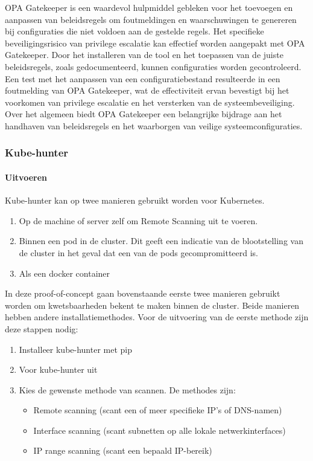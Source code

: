 OPA Gatekeeper is een waardevol hulpmiddel gebleken voor het toevoegen en aanpassen van beleidsregels om foutmeldingen en waarschuwingen te genereren bij configuraties die niet voldoen aan de gestelde regels. Het specifieke beveiligingsrisico van privilege escalatie kan effectief worden aangepakt met OPA Gatekeeper. Door het installeren van de tool en het toepassen van de juiste beleidsregels, zoals gedocumenteerd, kunnen configuraties worden gecontroleerd. Een test met het aanpassen van een configuratiebestand resulteerde in een foutmelding van OPA Gatekeeper, wat de effectiviteit ervan bevestigt bij het voorkomen van privilege escalatie en het versterken van de systeembeveiliging. Over het algemeen biedt OPA Gatekeeper een belangrijke bijdrage aan het handhaven van beleidsregels en het waarborgen van veilige systeemconfiguraties.

\subsubsection{Kube-hunter}

\paragraph{Uitvoeren}

Kube-hunter kan op twee manieren gebruikt worden voor Kubernetes. 
\begin{enumerate}
    \item Op de machine of server zelf om Remote Scanning uit te voeren.
    \item Binnen een pod in de cluster. Dit geeft een indicatie van de blootstelling van de cluster in het geval dat een van de pods gecompromitteerd is.
    \item Als een docker container
\end{enumerate}

In deze proof-of-concept gaan bovenstaande eerste twee manieren gebruikt worden om kwetsbaarheden bekent te maken binnen de cluster. 
Beide manieren hebben andere installatiemethodes. 
Voor de uitvoering van de eerste methode zijn deze stappen nodig:
\begin{enumerate}
    \item Installeer kube-hunter met pip
    \item Voor kube-hunter uit
    \item Kies de gewenste methode van scannen. De methodes zijn: 
    \begin{itemize}
        \item Remote scanning      (scant een of meer specifieke IP's of DNS-namen)
        \item Interface scanning   (scant subnetten op alle lokale netwerkinterfaces)
        \item IP range scanning    (scant een bepaald IP-bereik)
    \end{itemize}
\end{enumerate}

